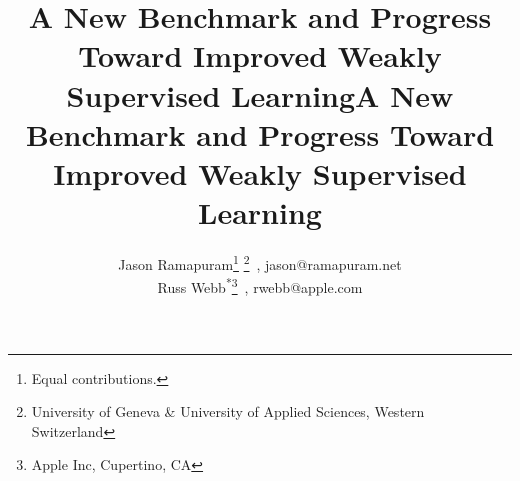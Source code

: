 \documentclass{article}
\begin{document}

\ifarxiv
	\title{A New Benchmark and Progress Toward Improved Weakly Supervised Learning}
	\author{Jason Ramapuram\footnote{Equal contributions.}
          \footnote{University of Geneva \& University of Applied
            Sciences, Western
          Switzerland}\ , jason@ramapuram.net \\ Russ Webb\textsuperscript{*}\footnote{Apple Inc, Cupertino, CA}\ , rwebb@apple.com}
	\maketitle
\else
        \title{A New Benchmark and Progress Toward Improved Weakly Supervised Learning}



        \maketitle
\fi



\end{document}
